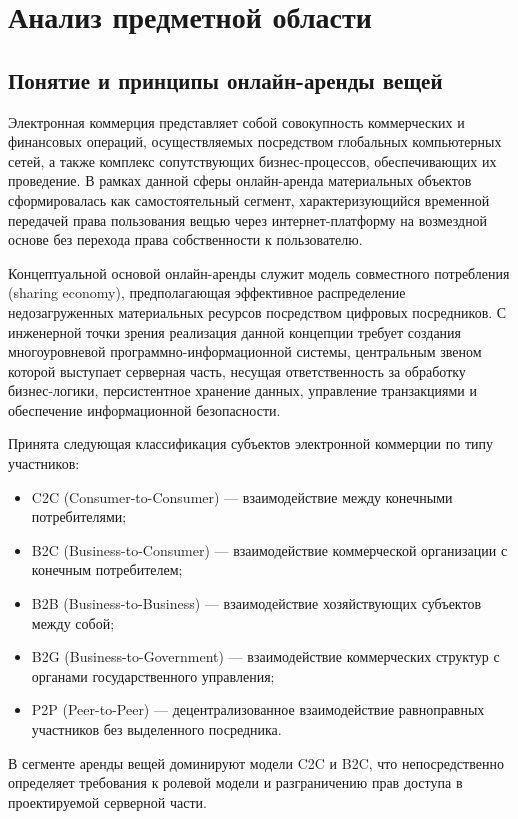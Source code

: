 \section{Анализ предметной области}
 
\subsection{Понятие и принципы онлайн-аренды вещей}
 
Электронная коммерция представляет собой совокупность коммерческих и финансовых операций, осуществляемых посредством глобальных компьютерных сетей, а также комплекс сопутствующих бизнес-процессов, обеспечивающих их проведение. В рамках данной сферы онлайн-аренда материальных объектов сформировалась как самостоятельный сегмент, характеризующийся временной передачей права пользования вещью через интернет-платформу на возмездной основе без перехода права собственности к пользователю.
 
Концептуальной основой онлайн-аренды служит модель совместного потребления (sharing economy), предполагающая эффективное распределение недозагруженных материальных ресурсов посредством цифровых посредников. С инженерной точки зрения реализация данной концепции требует создания многоуровневой программно-информационной системы, центральным звеном которой выступает серверная часть, несущая ответственность за обработку бизнес-логики, персистентное хранение данных, управление транзакциями и обеспечение информационной безопасности.
 
Принята следующая классификация субъектов электронной коммерции по типу участников:
\begin{itemize}
    \item C2C (Consumer-to-Consumer) — взаимодействие между конечными потребителями;
    \item B2C (Business-to-Consumer) — взаимодействие коммерческой организации с конечным потребителем;
    \item B2B (Business-to-Business) — взаимодействие хозяйствующих субъектов между собой;
    \item B2G (Business-to-Government) — взаимодействие коммерческих структур с органами государственного управления;
    \item P2P (Peer-to-Peer) — децентрализованное взаимодействие равноправных участников без выделенного посредника.
\end{itemize}
 
В сегменте аренды вещей доминируют модели C2C и B2C, что непосредственно определяет требования к ролевой модели и разграничению прав доступа в проектируемой серверной части.
 
